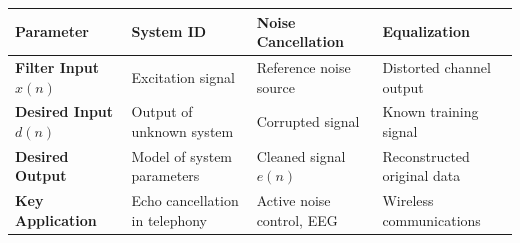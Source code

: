 \documentclass[12pt,a4paper]{article}
\renewcommand{\arraystretch}{1.45}
\begin{document}
\begin{tcolorbox}[tikzbox, title={Comparison of Adaptive Filter Application Classes}]
\renewcommand{\arraystretch}{1.4}
\par\noindent
{\renewcommand{\arraystretch}{1.55}%
\begin{tabularx}{\linewidth}{|B{2.8cm}|Y|Y|Y|}\hline
\textbf{Parameter} & \textbf{System ID} & \textbf{Noise Cancellation} & \textbf{Equalization} \\
\hline
\textbf{Filter Input $x(n)$} & Excitation signal & Reference noise source & Distorted channel output \\[4pt]
\hline
\textbf{Desired Input $d(n)$} & Output of unknown system & Corrupted signal & Known training signal \\[4pt]
\hline
\textbf{Desired Output} & Model of system parameters & Cleaned signal $e(n)$ & Reconstructed original data \\[4pt]
\hline
\textbf{Key Application} & Echo cancellation in telephony & Active noise control, EEG & Wireless communications \\[4pt]
\hline
\end{tabularx}
}
\end{tcolorbox}
\end{document}
